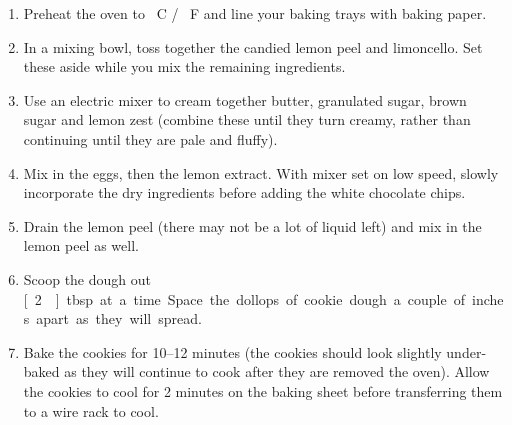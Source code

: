 \documentclass[main.tex]{subfiles}
\begin{document}
\begin{enumerate}
    \item Preheat the oven to \unit[180]{\textdegree C} / \unit[350]{\textdegree F} and line your baking trays with baking paper.
    \item In a mixing bowl, toss together the candied lemon peel and limoncello. Set these aside while you mix the remaining ingredients. 
    \item Use an electric mixer to cream together butter, granulated sugar, brown sugar and lemon zest (combine these until they turn creamy, rather than continuing until they are pale and fluffy). 
    \item Mix in the eggs, then the lemon extract. With mixer set on low speed, slowly incorporate the dry ingredients before adding the white chocolate chips.
    \item Drain the lemon peel (there may not be a lot of liquid left) and mix in the lemon peel as well.
    \item Scoop the dough out \unit[2]{tbsp} at a time. Space the dollops of cookie dough a couple of inches apart as they will spread. 
    \item Bake the cookies for 10--12 minutes (the cookies should look slightly under-baked as they will continue to cook after they are removed the oven). Allow the cookies to cool for 2 minutes on the baking sheet before transferring them to a wire rack to cool.
\end{enumerate}
\end{document}
